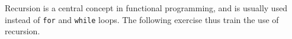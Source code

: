 Recursion is a central concept in functional programming, and is usually used instead of \lstinline!for! and \lstinline!while! loops. The following exercise thus train the use of recursion.